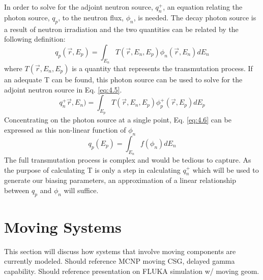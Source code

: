In order to solve for the adjoint neutron source, $q_n^{+}$, an equation
relating the photon source, $q_p$, to the neutron flux, $\phi_n$, is needed.
The decay photon source is a result of neutron irradiation and 
the two quantities can be related by the following
definition:
\begin{equation} \label{eq:4.6}
	q_p(\overrightarrow{r}, E_{p}) = 
	\int_{E_n}T(\overrightarrow{r}, E_{n}, E_{p})
	\phi_{n}(\overrightarrow{r}, E_{n}) dE_{n}
\end{equation}
where $T(\overrightarrow{r}, E_{n}, E_{p})$ is a quantity that represents the
transmutation process.  If an adequate T can be found, this photon source can
be used to solve for the adjoint neutron source in Eq. \ref{eq:4.5}.
\begin{equation} \label{eq:4.7}
        q_{n}^{+}\overrightarrow{r},E_{n})
        = \int_{E_p}T(\overrightarrow{r}, E_{n}, E_{p})
	\phi_{p}^{+}(\overrightarrow{r}, E_{p}) dE_{p}
\end{equation}
Concentrating on the photon source at a single point, Eq. \ref{eq:4.6} can be
expressed as this non-linear function of $\phi_n$ 
\begin{equation} \label{eq:4.8}
	q_{p}(E_{p}) = \int_{E_n} f(\phi_{n}) dE_{n}
\end{equation}
The full transmutation process is complex and would be
tedious to capture.  As the purpose of calculating T is only a step in
calculating $q_{n}^{+}$ which will be used to generate our biasing parameters,
an approximation of a linear relationship between $q_p$ and $\phi_n$ will suffice.  


\section{Moving Systems} \label{sec:moving_sys}
This section will discuss how systems that involve moving components are
currently modeled.
Should reference MCNP moving CSG, delayed gamma capability.
Should reference presentation on FLUKA simulation w/ moving geom.


